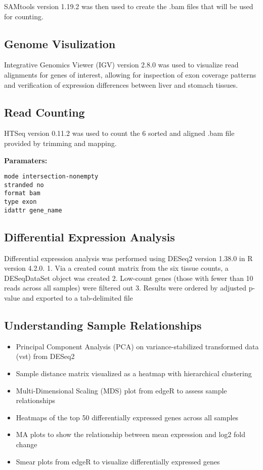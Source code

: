 \documentclass[
]{article}
\providecommand{\tightlist}{%
  \setlength{\itemsep}{0pt}\setlength{\parskip}{0pt}}
\begin{document}
SAMtools version 1.19.2 was then used to create the .bam files that will
be used for counting.

\subsection{Genome Visulization}\label{genome-visulization}

Integrative Genomics Viewer (IGV) version 2.8.0 was used to visualize
read alignments for genes of interest, allowing for inspection of exon
coverage patterns and verification of expression differences between
liver and stomach tissues.

\subsection{Read Counting}\label{read-counting}

HTSeq version 0.11.2 was used to count the 6 sorted and aligned .bam
file provided by trimming and mapping.

\textbf{Paramaters:}

\begin{verbatim}
mode intersection-nonempty
stranded no
format bam
type exon
idattr gene_name
\end{verbatim}

\subsection{Differential Expression
Analysis}\label{differential-expression-analysis}

Differential expression analysis was performed using DESeq2 version
1.38.0 in R version 4.2.0. 1. Via a created count matrix from the six
tissue counts, a DESeqDataSet object was created 2. Low-count genes
(those with fewer than 10 reads across all samples) were filtered out 3.
Results were ordered by adjusted p-value and exported to a tab-delimited
file

\subsection{Understanding Sample
Relationships}\label{understanding-sample-relationships}

\begin{itemize}
\tightlist
\item
  Principal Component Analysis (PCA) on variance-stabilized transformed
  data (vst) from DESeq2
\item
  Sample distance matrix visualized as a heatmap with hierarchical
  clustering
\item
  Multi-Dimensional Scaling (MDS) plot from edgeR to assess sample
  relationships
\item
  Heatmaps of the top 50 differentially expressed genes across all
  samples
\item
  MA plots to show the relationship between mean expression and log2
  fold change
\item
  Smear plots from edgeR to visualize differentially expressed genes
\end{itemize}
\end{document}
